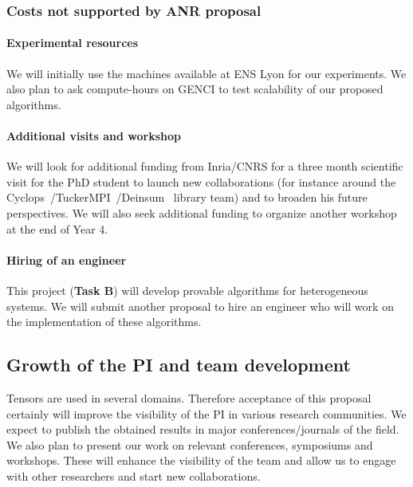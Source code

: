 \documentclass[a4paper,11pt]{article}
\begin{document}
	\subsubsection*{Costs not supported by ANR proposal}
	\paragraph{Experimental resources} We will initially use the machines available at ENS Lyon for our experiments. We also plan to ask compute-hours on GENCI to test scalability of our proposed algorithms.
	
	
	
	
	
	\paragraph{Additional visits and workshop} We will look for additional funding from Inria/CNRS for a three month scientific visit for the PhD student to launch new collaborations (for instance around the Cyclops~\cite{SMHD-IPDPS-2013}/TuckerMPI~\cite{BKK-TOMS-2020}/Deinsum~\cite{ZKBSH-SC-2022} library team) and to broaden his future perspectives. We will also seek additional funding to organize another workshop at the end of Year 4.
	
	\paragraph{Hiring of an engineer} This project (\textbf{Task B}) will develop provable algorithms for heterogeneous systems. We will submit another proposal to hire an engineer who will work on the implementation of these algorithms.
	
	\subsection{Growth of the PI and team development}
	\label{sec:org:growth}
	Tensors are used in several domains. Therefore acceptance of this proposal certainly will improve the visibility of the PI in various research communities. We expect to publish the obtained results in major conferences/journals of the field. We also plan to present our work on relevant conferences, symposiums and workshops. These will enhance the visibility of the team and allow us to engage with other researchers and start new collaborations.
	
\end{document}
